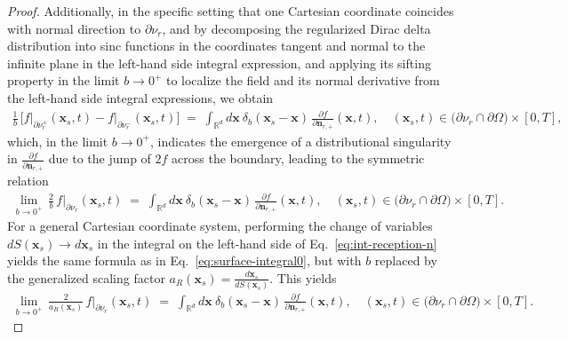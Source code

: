 \documentclass[11pt,reqno]{amsart}
\theoremstyle{remark}
\theoremstyle{italic_lemma}
\newcommand{\bx}{\boldsymbol{x}}
\newcommand{\bn}{\boldsymbol{n}}
\begin{document}
\begin{proof}
Additionally, in the specific setting that one Cartesian coordinate coincides with normal direction to \( \partial \nu_r \), and by 
decomposing the regularized Dirac delta distribution into sinc functions in the coordinates tangent and normal to the infinite plane in the left-hand side integral expression, and applying its 
sifting property in the limit \(b \to 0^+\) to localize the field and its 
normal derivative from the left-hand side integral expressions, we obtain
\begin{align} \label{eq:surface-integral2}
  \frac{1}{b} \,
  \Big[ f \big|_{\partial \nu_r^+} (\bx_s, t)- f \big|_{\partial \nu_r^-} (\bx_s, t)\Big]
  \;=\;\int_{\mathbb{R}^d} d\bx \ \delta_b(\bx_s - \bx) \, 
  \frac{\partial f}{\partial \bn_{r,+}}(\bx, t), \quad (\bx_s, t) \in \big( \partial \nu_r \cap \partial \Omega \big) \times [0,T],
\end{align}
which, in the limit \( b \to 0^+ \), indicates the emergence of a 
distributional singularity in 
\( \tfrac{\partial f}{\partial \bn_{r,+}} \) 
due to the jump of \( 2 f \) across the boundary, leading to the symmetric relation
\begin{align} \label{eq:surface-integral0}
  \lim_{b \to 0^+} \, \frac{2}{b}\, f\big|_{\partial \nu_r} (\bx_s, t)
  \;=\;\int_{\mathbb{R}^d} d\bx \ \delta_b(\bx_s - \bx) \, 
  \frac{\partial f}{\partial \bn_{r,+}}(\bx, t), \quad (\bx_s, t) \in \big( \partial \nu_r \cap \partial \Omega \big) \times [0,T].
\end{align}
For a general Cartesian coordinate system, performing the change of variables \( dS(\bx_s) \to d \bx_s \) in the integral on the left-hand side of Eq.~\eqref{eq:int-reception-n} yields the same formula as in Eq.~\eqref{eq:surface-integral0}, but with \( b \) replaced by the generalized scaling factor \( a_R(\bx_s) = \frac{d \bx_s}{dS(\bx_s)} \). This yields
\begin{align} \label{eq:surface-integral}
  \lim_{b \to 0^+} \, \frac{2}{a_R(\bx_s)}\, f\big|_{\partial \nu_r} (\bx_s, t)
  \;=\;\int_{\mathbb{R}^d} d\bx \ \delta_b(\bx_s - \bx) \, 
  \frac{\partial f}{\partial \bn_{r,+}}(\bx, t), \quad (\bx_s, t) \in \big( \partial \nu_r \cap \partial \Omega \big) \times [0,T].
\end{align}


\end{proof}
\end{document}
